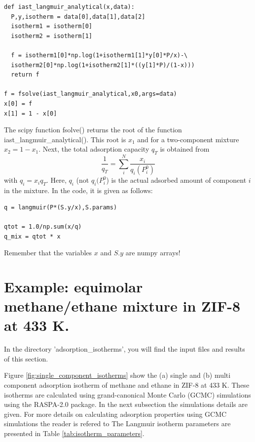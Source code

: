 \documentclass{article}
\begin{document}
\begin{lstlisting}[caption={Find root of equation (\ref{eq:find_root}) and obtain $x_1$.}]
def iast_langmuir_analytical(x,data):
  P,y,isotherm = data[0],data[1],data[2]
  isotherm1 = isotherm[0]
  isotherm2 = isotherm[1]

  f = isotherm1[0]*np.log(1+isotherm1[1]*y[0]*P/x)-\
  isotherm2[0]*np.log(1+isotherm2[1]*((y[1]*P)/(1-x)))
  return f

f = fsolve(iast_langmuir_analytical,x0,args=data)
x[0] = f
x[1] = 1 - x[0]
\end{lstlisting}

The scipy function fsolve() returns the root of the function iast\_langmuir\_analytical(). This root is $x_1$ and for a two-component mixture $x_2 = 1 - x_1$. Next, the total adsorption capacity $q_T$ is obtained from
%
\begin{equation}
        \frac{1}{q_T} = \sum_{i}^N\frac{x_i}{q_i(P_i^0)}
	\label{eq:total_adsorbed_loading}
\end{equation}
%
with $q_i={x_i}q_T$. Here, $q_i$ (not $q_i(P_i^0$) is the actual adsorbed amount of component $i$ in the mixture. In the code, it is given as follows: 
%
\begin{lstlisting}[caption={Compute the mixture adsorption isotherms based on equation (\ref{eq:total_adsorbed_loading}).}]
q = langmuir(P*(S.y/x),S.params)

qtot = 1.0/np.sum(x/q)
q_mix = qtot * x
\end{lstlisting}
%
Remember that the variables $x$ and $S.y$ are numpy arrays!

\section{Example: equimolar methane/ethane mixture in ZIF-8 at 433 K.}
In the directory 'adsorption\_isotherms', you will find the input files and results of this section.

Figure \ref{fig:single_component_isotherms} show the (a) single and (b) multi component adsorption isotherm of methane and ethane in ZIF-8 at 433 K. These isotherms are calculated using grand-canonical Monte Carlo (GCMC) simulations using the RASPA-2.0 package.\cite{Dubbeldam2013} In the next subsection the simulations details are given. For more details on calculating adsorption properties using GCMC simulations the reader is refered to \cite{Frenkel2001,Dubbeldam2013,Dubbeldam2015} The Langmuir isotherm parameters are presented in Table \ref{tab:isotherm_parameters}.
\end{document}
